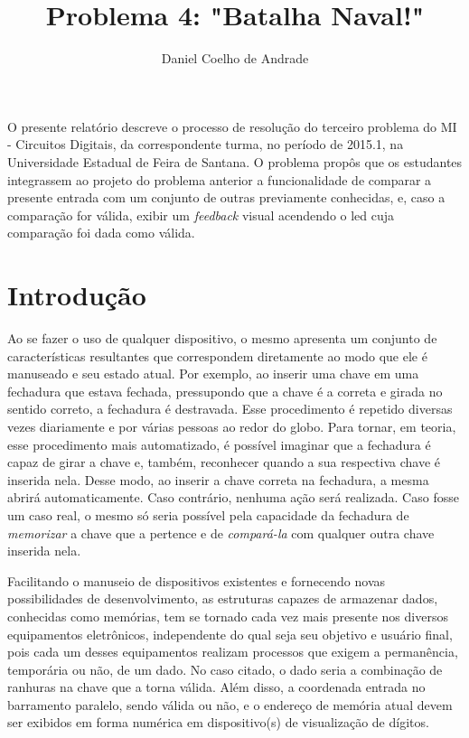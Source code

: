 \documentclass[12pt]{article}
\title{Problema 4: "Batalha Naval!"}
\author{Daniel Coelho de Andrade\inst{1}}
\begin{document}
 

\maketitle

\begin{resumo} 
  O presente relatório descreve o processo de resolução do terceiro problema do MI - Circuitos Digitais, da correspondente turma, no período de 2015.1, na Universidade Estadual de Feira de Santana. O problema propôs que os estudantes integrassem ao projeto do problema anterior a funcionalidade de comparar a presente entrada com um conjunto de outras previamente conhecidas, e, caso a comparação for válida, exibir um \textit{feedback} visual acendendo o led cuja comparação foi dada como válida.
\end{resumo}

\section{Introdução} \label{sec:firstpage}

Ao se fazer o uso de qualquer dispositivo, o mesmo apresenta um conjunto de características resultantes que correspondem diretamente ao modo que ele é manuseado e seu estado atual. Por exemplo, ao inserir uma chave em uma fechadura que estava fechada, pressupondo que a chave é a correta e girada no sentido correto, a fechadura é destravada. Esse procedimento é repetido diversas vezes diariamente e por várias pessoas ao redor do globo. Para tornar, em teoria, esse procedimento mais automatizado, é possível imaginar que a fechadura é capaz de girar a chave e, também, reconhecer quando a sua respectiva chave é inserida nela. Desse modo, ao inserir a chave correta na fechadura, a mesma abrirá automaticamente. Caso contrário, nenhuma ação será realizada. Caso fosse um caso real, o mesmo só seria possível pela capacidade da fechadura de \textit{memorizar} a chave que a pertence e de \textit{compará-la} com qualquer outra chave inserida nela.

Facilitando o manuseio de dispositivos existentes e fornecendo novas possibilidades de desenvolvimento, as estruturas capazes de armazenar dados, conhecidas como memórias, tem se tornado cada vez mais presente nos diversos equipamentos eletrônicos, independente do qual seja seu objetivo e usuário final, pois cada um desses equipamentos realizam processos que exigem a permanência, temporária ou não, de um dado. No caso citado, o dado seria a combinação de ranhuras na chave que a torna válida. Além disso, a coordenada entrada no barramento paralelo, sendo válida ou não, e o endereço de memória atual devem ser exibidos em forma numérica em dispositivo(s) de visualização de dígitos.
\end{document}
